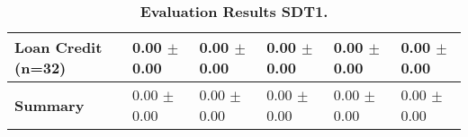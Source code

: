 \begin{table}[htb]
{\begin{tabular}{llllll}
\textbf{Loan Credit (n=32)                       } &  \phantom{0}0.00 $\pm$ \phantom{0}0.00 &             \phantom{0}0.00 $\pm$ \phantom{0}0.00 &  \phantom{0}0.00 $\pm$ \phantom{0}0.00 &  \phantom{0}0.00 $\pm$ \phantom{0}0.00 &  \phantom{0}0.00 $\pm$ \phantom{0}0.00 \\
\midrule
\textbf{Summary                                  } &  \phantom{0}0.00 $\pm$ \phantom{0}0.00 &             \phantom{0}0.00 $\pm$ \phantom{0}0.00 &  \phantom{0}0.00 $\pm$ \phantom{0}0.00 &  \phantom{0}0.00 $\pm$ \phantom{0}0.00 &  \phantom{0}0.00 $\pm$ \phantom{0}0.00 \\
\bottomrule
\end{tabular}%
}
\caption{\textbf{Evaluation Results SDT1.}}
\label{tab:eval-results}
\end{table}


